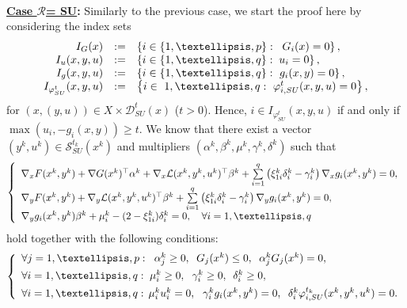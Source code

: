 ${}$\\
\noindent \textbf{\underline{Case $ \mathcal{R}$= SU}:}  Similarly to the previous case, we start the proof here by considering the index sets
\[
\begin{array}
[c]{rll}
I_{G}(x) & := & \left\{  i\in\{1,\ldots,p\}:\;\;G_{i}(x)=0\right\}  ,\\
I_{u}(x,y,u) & := & \left\{  i\in\{1,\ldots,q\}:\;u_{i}=0\right\}  ,\\
I_{g}(x,y,u) & := & \left\{  i\in\{1,\ldots,q\}:\text{ }g_{i}(x,y)=0\right\}  ,\\
I_{\varphi^{t}_{SU}}(x,y,u) & := & \left\{  i\in\ 1,\ldots,q:\text{ }\varphi_{i,SU}^{t}(x,y,u)=0\right\},
\end{array}
\]
 for $(x,(y,u))\in X\times\mathcal{D}_{SU}^{t}(x)$ ($t>0$). Hence, 
$i\in I_{\varphi^{t}_{SU}}(x,y,u)$ if and only if $\max(u_{i},-g_{i}(x,y))\geq t$. 
	We know that there exist a
	vector $(y^{k},u^{k})\in\mathcal{S}_{SU}^{t_{k}}(x^{k})$ and multipliers
	$(\alpha^{k},\beta^{k},\mu^{k},\gamma^{k},\delta^{k})$ such that 
	\begin{equation}
	\left\{
	\begin{array}
	[c]{l}
	\nabla_{x}F(x^{k},y^{k})+\nabla G(x^{k})^{\top}\alpha^{k}+\nabla
	_{x}\mathcal{L}(x^{k},y^{k},u^{k})^{\top}\beta^{k}+\sum\limits_{i=1}
	^{q}\left(  \xi_{1i}^{k}\delta_{i}^{k}-\gamma_{i}^{k}\right)  \nabla_{x}
	g_{i}(x^{k},y^{k})=0,\\[1ex]
	\nabla_{y}F(x^{k},y^{k})+\nabla_{y}\mathcal{L}(x^{k},y^{k},u^{k})^{\top}
	\beta^{k}+\sum\limits_{i=1}^{q}\left(  \xi_{1i}^{k}\delta_{i}^{k}-\gamma
	_{i}^{k}\right)  \nabla_{y}g_{i}(x^{k},y^{k})=0,\\[1ex]
	\nabla_{y}g_{i}(x^{k},y^{k})\beta^{k}+\mu_{i}^{k}-(2-\xi_{1i}^{k})\delta
	_{i}^{k}=0,\text{ \ \ }\forall i=1,\ldots,q
	\end{array}
	\right.  \label{t2}
	\end{equation}
	hold together with the following  conditions:
	\begin{equation}
	\left\{
	\begin{array}
	[c]{l}
	\forall j=1,\ldots,p:\;\;\alpha_{j}^{k}\geq0,\;\;G_{j}(x^{k})\leq
	0,\;\;\alpha_{j}^{k}G_{j}(x^{k})=0,\\[1ex]
	\forall i=1,\ldots,q:\;\mu_{i}^{k}\geq0,\;\ \gamma_{i}^{k}\geq0,\,\,\,\delta
	_{i}^{k}\geq0,\\[1ex]
	\forall i=1,\ldots,q:\,\mu_{i}^{k}u_{i}^{k}=0,\ \ \gamma_{i}^{k}g_{i}
	(x^{k},y^{k})=0,\;\;\delta_{i}^{k}\varphi^{t_{k}}_{i,SU}(x^{k},y^{k},u^{k})=0.
	\end{array}
	\right.  \label{t3}
	\end{equation}
